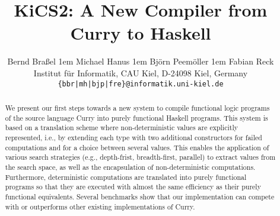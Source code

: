 \documentclass{scrartcl}
\begin{document}
\title{KiCS2: A New Compiler from Curry to Haskell}

\author{
Bernd Bra\ss{}el
\kern1em
Michael Hanus
\kern1em
 Bj{\"o}rn Peem{\"o}ller
\kern1em
Fabian Reck \\
Institut f{\"u}r Informatik, CAU Kiel, D-24098 Kiel, Germany \\
\texttt{\{bbr|mh|bjp|fre\}@informatik.uni-kiel.de}}
\date{}
\maketitle
\thispagestyle{empty}

\begin{abstract}
We present our first steps towards a new system to compile functional logic
programs of the source language Curry into purely functional Haskell programs.
This system is based on a translation scheme where non-deterministic values
are explicitly represented, i.e., by extending each type with two additional
constructors for failed computations and for a choice between several values.
This enables the application of various search
strategies (e.g., depth-frist, breadth-first, parallel) to extract values from
the search space, as well as the encapsulation of non-deterministic
computations. Furthermore, deterministic computations are translated into purely
functional programs so that they are executed with almost the same efficiency as
their purely functional equivalents. Several benchmarks show that our
implementation can compete with or outperforms other existing implementations
of Curry.
\end{abstract}
\end{document}
